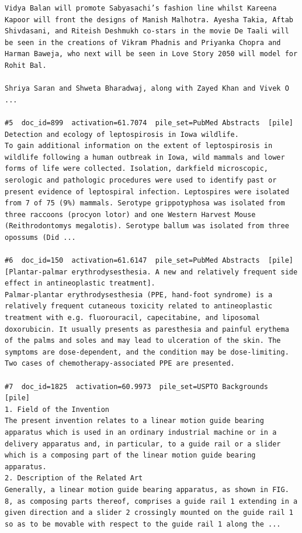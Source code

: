 \begin{verbatim}
Vidya Balan will promote Sabyasachi’s fashion line whilst Kareena Kapoor will front the designs of Manish Malhotra. Ayesha Takia, Aftab Shivdasani, and Riteish Deshmukh co-stars in the movie De Taali will be seen in the creations of Vikram Phadnis and Priyanka Chopra and Harman Baweja, who next will be seen in Love Story 2050 will model for Rohit Bal.

Shriya Saran and Shweta Bharadwaj, along with Zayed Khan and Vivek O ...

#5  doc_id=899  activation=61.7074  pile_set=PubMed Abstracts  [pile]
Detection and ecology of leptospirosis in Iowa wildlife.
To gain additional information on the extent of leptospirosis in wildlife following a human outbreak in Iowa, wild mammals and lower forms of life were collected. Isolation, darkfield microscopic, serologic and pathologic procedures were used to identify past or present evidence of leptospiral infection. Leptospires were isolated from 7 of 75 (9%) mammals. Serotype grippotyphosa was isolated from three raccoons (procyon lotor) and one Western Harvest Mouse (Reithrodontomys megalotis). Serotype ballum was isolated from three opossums (Did ...

#6  doc_id=150  activation=61.6147  pile_set=PubMed Abstracts  [pile]
[Plantar-palmar erythrodysesthesia. A new and relatively frequent side effect in antineoplastic treatment].
Palmar-plantar erythrodysesthesia (PPE, hand-foot syndrome) is a relatively frequent cutaneous toxicity related to antineoplastic treatment with e.g. fluorouracil, capecitabine, and liposomal doxorubicin. It usually presents as paresthesia and painful erythema of the palms and soles and may lead to ulceration of the skin. The symptoms are dose-dependent, and the condition may be dose-limiting. Two cases of chemotherapy-associated PPE are presented.

#7  doc_id=1825  activation=60.9973  pile_set=USPTO Backgrounds  [pile]
1. Field of the Invention
The present invention relates to a linear motion guide bearing apparatus which is used in an ordinary industrial machine or in a delivery apparatus and, in particular, to a guide rail or a slider which is a composing part of the linear motion guide bearing apparatus.
2. Description of the Related Art
Generally, a linear motion guide bearing apparatus, as shown in FIG. 8, as composing parts thereof, comprises a guide rail 1 extending in a given direction and a slider 2 crossingly mounted on the guide rail 1 so as to be movable with respect to the guide rail 1 along the ...


\end{verbatim}
